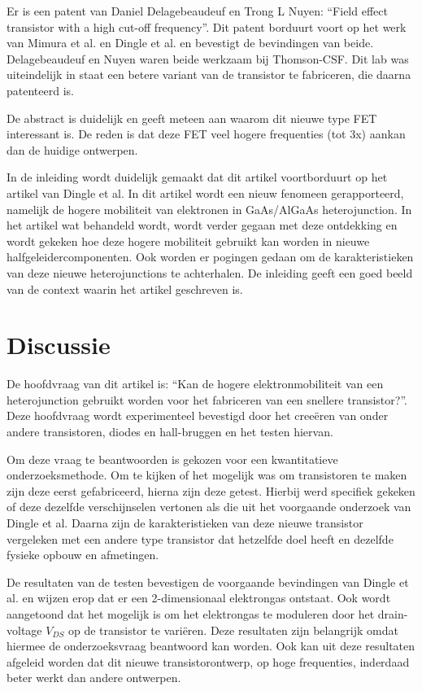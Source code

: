 \documentclass[11pt]{article}
\begin{document}
Er is een patent van Daniel Delagebeaudeuf en Trong L Nuyen: ``Field effect transistor with a high cut-off frequency''. Dit patent borduurt voort op het werk van Mimura et al. en Dingle et al. en bevestigt de bevindingen van beide. Delagebeaudeuf en Nuyen waren beide werkzaam bij Thomson-CSF. Dit lab was uiteindelijk in staat een betere variant van de transistor te fabriceren, die daarna patenteerd is.

De abstract is duidelijk en geeft meteen aan waarom dit nieuwe type FET interessant is. De reden is dat deze FET veel hogere frequenties (tot 3x) aankan dan de huidige ontwerpen. 

In de inleiding wordt duidelijk gemaakt dat dit artikel voortborduurt op het artikel van Dingle et al. In dit artikel wordt een nieuw fenomeen gerapporteerd, namelijk de hogere mobiliteit van elektronen in GaAs/AlGaAs heterojunction. In het artikel wat behandeld wordt, wordt verder gegaan met deze ontdekking en wordt gekeken hoe deze hogere mobiliteit gebruikt kan worden in nieuwe halfgeleidercomponenten. Ook worden er pogingen gedaan om de karakteristieken van deze nieuwe heterojunctions te achterhalen. De inleiding geeft een goed beeld van de context waarin het artikel geschreven is.

\section{Discussie}
De hoofdvraag van dit artikel is: ``Kan de hogere elektronmobiliteit van een heterojunction gebruikt worden voor het fabriceren van een snellere transistor?''. Deze hoofdvraag wordt experimenteel bevestigd door het cree\"eren van onder andere transistoren, diodes en hall-bruggen en het testen hiervan.

Om deze vraag te beantwoorden is gekozen voor een kwantitatieve onderzoeksmethode. Om te kijken of het mogelijk was om transistoren te maken zijn deze eerst gefabriceerd, hierna zijn deze getest. Hierbij werd specifiek gekeken of deze dezelfde verschijnselen vertonen als die uit het voorgaande onderzoek van Dingle et al. Daarna zijn de karakteristieken van deze nieuwe transistor vergeleken met een andere type transistor dat hetzelfde doel heeft en dezelfde fysieke opbouw en afmetingen.

De resultaten van de testen bevestigen de voorgaande bevindingen van Dingle et al. en wijzen erop dat er een 2-dimensionaal elektrongas ontstaat. Ook wordt aangetoond dat het mogelijk is om het elektrongas te moduleren door het drain-voltage $V_{DS}$ op de transistor te vari\"eren. Deze resultaten zijn belangrijk omdat hiermee de onderzoeksvraag beantwoord kan worden. Ook kan uit deze resultaten afgeleid worden dat dit nieuwe transistorontwerp, op hoge frequenties, inderdaad beter werkt dan andere ontwerpen.
\end{document}

